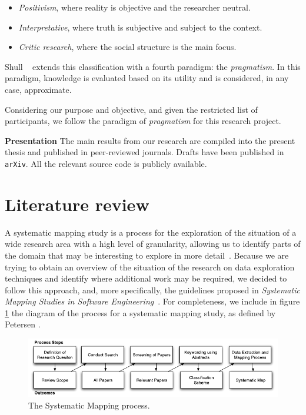 \begin{itemize}
    \item \emph{Positivism}, where reality is objective and the researcher neutral.
    \item \emph{Interpretative}, where truth is subjective and subject to the context.
    \item \emph{Critic research}, where the social structure is the main focus.
\end{itemize}

Shull \etal~\cite{Shull2008} extends this classification with a fourth paradigm:
the \emph{pragmatism}. In this paradigm, knowledge is evaluated based on its
utility and is considered, in any case, approximate.

Considering our purpose and objective, and given the restricted list of
participants, we follow the paradigm of \emph{pragmatism} for this research project.

\textbf{Presentation}
\label{method:presentation}
The main results from our research are compiled into the present thesis
and published in peer-reviewed journals. Drafts have been published in \texttt{arXiv}.
All the relevant source code is publicly available.

\section{Literature review}
\label{sec:method_literature_review}
A systematic mapping study is a process for the exploration of
the situation of a wide research area with a high level of granularity,
allowing us to identify parts of the domain that may be interesting to
explore in more detail~\cite{Kitchenham2007}. Because we are trying to obtain
an overview of the situation of the research on data exploration techniques
and identify where additional work may be required, we decided to follow this
approach, and, more specifically, the guidelines proposed in
\emph{Systematic Mapping Studies in Software Engineering}~\cite{Petersen2007}.
For completeness, we include in figure \ref{fig:systematicmapping_diagram} the
diagram of the process for a systematic mapping study, as defined by
Petersen \etal.

\begin{figure}[htbp]
    \centering
    \includegraphics{images/3_mapping/systematicmapping_diagram}
    \caption{The Systematic Mapping process.}
    \label{fig:systematicmapping_diagram}
\end{figure}

